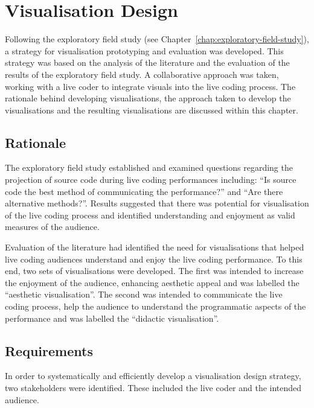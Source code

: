 
\chapter{Visualisation Design}
\label{chap:visualisation-design}

Following the exploratory field study (see Chapter~\ref{chap:exploratory-field-study}), a strategy for visualisation prototyping and evaluation was developed. This strategy was based on the analysis of the literature and the evaluation of the results of the exploratory field study. A collaborative approach was taken, working with a live coder to integrate visuals into the live coding process. The rationale behind developing visualisations, the approach taken to develop the visualisations and the resulting visualisations are discussed within this chapter.

\section{Rationale}


The exploratory field study established and examined questions regarding the projection of source code during live coding performances including: ``Is source code the best method of communicating the performance?'' and ``Are there alternative methods?''. Results suggested that there was potential for visualisation of the live coding process and identified understanding and enjoyment as valid measures of the audience.

Evaluation of the literature had identified the need for visualisations that helped live coding audiences understand and enjoy the live coding performance. To this end, two sets of visualisations were developed. The first was intended to increase the enjoyment of the audience, enhancing aesthetic appeal and was labelled the ``aesthetic visualisation''. The second was intended to communicate the live coding process, help the audience to understand the programmatic aspects of the performance and was labelled the ``didactic visualisation''.

\section{Requirements}

In order to systematically and efficiently develop a visualisation design strategy, two stakeholders were identified. These included the live coder and the intended audience.

